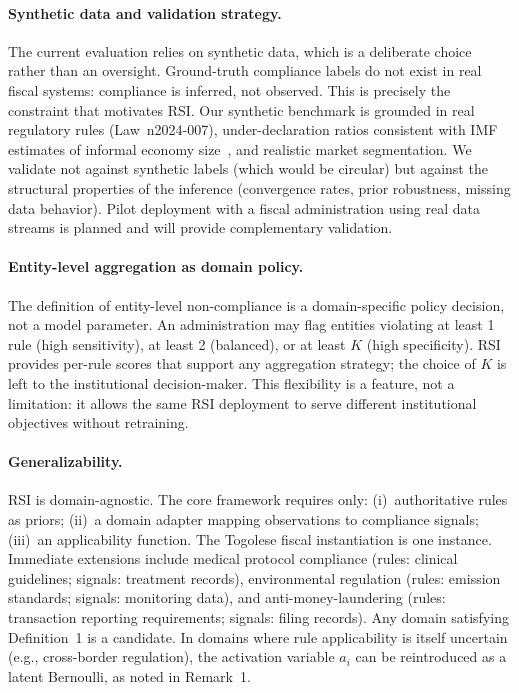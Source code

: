 \documentclass[letterpaper]{article}
\begin{document}
\paragraph{Synthetic data and validation strategy.}
The current evaluation relies on synthetic data, which is a deliberate
choice rather than an oversight. Ground-truth compliance labels do not
exist in real fiscal systems: compliance is inferred, not observed.
This is precisely the constraint that motivates RSI. Our synthetic
benchmark is grounded in real regulatory rules
(Law~n\textdegree{}2024-007), under-declaration ratios
consistent with IMF estimates of informal economy
size~\citep{medina2017informal}, and realistic market
segmentation. We validate not against synthetic labels (which would be
circular) but against the structural properties of the inference
(convergence rates, prior robustness, missing data behavior). Pilot
deployment with a fiscal administration using real data streams is
planned and will provide complementary validation.

\paragraph{Entity-level aggregation as domain policy.}
The definition of entity-level non-compliance is a domain-specific
policy decision, not a model parameter. An administration may flag
entities violating at least 1 rule (high sensitivity), at least 2
(balanced), or at least $K$ (high specificity). RSI provides per-rule
scores that support any aggregation strategy; the choice of $K$ is
left to the institutional decision-maker. This flexibility is a
feature, not a limitation: it allows the same RSI deployment to serve
different institutional objectives without retraining.

\paragraph{Generalizability.}
RSI is domain-agnostic. The core framework requires only:
(i)~authoritative rules as priors; (ii)~a domain adapter mapping
observations to compliance signals; (iii)~an applicability function.
The Togolese fiscal instantiation is one instance. Immediate extensions
include medical protocol compliance (rules: clinical guidelines;
signals: treatment records), environmental regulation (rules: emission
standards; signals: monitoring data), and anti-money-laundering (rules:
transaction reporting requirements; signals: filing records). Any
domain satisfying Definition~1 is a candidate. In domains where rule
applicability is itself uncertain (e.g., cross-border regulation),
the activation variable $a_i$ can be reintroduced as a latent
Bernoulli, as noted in Remark~1.
\end{document}

